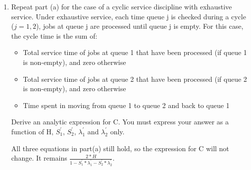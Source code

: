 \documentclass[12pt]{article}
\begin{document}
\begin{enumerate}
\begin{enumerate}
\item{} Repeat part (a) for the case of a cyclic service discipline with exhaustive service. Under exhaustive
service, each time queue j is checked during a cycle ($j = 1, 2$), jobs at queue j are processed until queue
j is empty. For this case, the cycle time is the sum of:
\begin{itemize}
\item{} Total service time of jobs at queue 1 that have been processed (if queue 1 is non-empty), and zero otherwise
\item{} Total service time of jobs at queue 2 that have been processed (if queue 2 is non-empty), and zero otherwise
\item{} Time spent in moving from queue 1 to queue 2 and back to queue 1
\end{itemize}
Derive an analytic expression for C. You must express your answer as a function of H, $S_1^{'}$, $S_2^{'}$, $\lambda_1^{'}$ and $\lambda_2^{'}$ only.

All three equations in part(a) still hold, so the expression for C will not change. It remains $\frac{2 * H}{1 - S_1^{'} * \lambda_1^{'} - S_2^{'} * \lambda_2^{'}}$.
\end{enumerate}


\end{enumerate}
\end{document}
